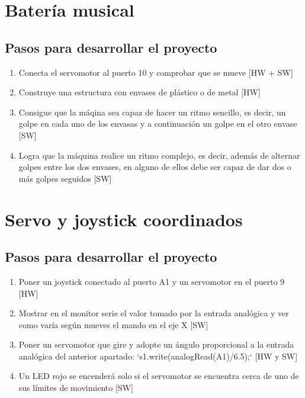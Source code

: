 \documentclass[11pt,spanish,a4paper]{article}
\begin{document}
\newpage
\section{Batería musical}

\subsection{Pasos para desarrollar el proyecto}
\begin{enumerate}
	\item Conecta el servomotor al puerto 10 y comprobar que se mueve [HW + SW]
	\item Construye una estructura con envases de plástico o de metal [HW]
	\item Consigue que la máqina sea capaz de hacer un ritmo sencillo, es decir, un golpe en
		cada uno de los envasas y a continuación un golpe en el otro envase [SW]
	\item Logra que la máquina realice un ritmo complejo, es decir, además de alternar golpes entre los
		dos envases, en alguno de ellos debe ser capaz de dar dos o más golpes seguidos [SW]
\end{enumerate}

\newpage
\section{Servo y joystick coordinados}

\subsection{Pasos para desarrollar el proyecto}
\begin{enumerate}
	\item Poner un joystick conectado al puerto A1 y un servomotor en el puerto 9 [HW]
	\item Mostrar en el monitor serie el valor tomado por la entrada analógica y ver como varía
		según mueves el mando en el eje X [SW]
	\item Poner un servomotor que gire y adopte un ángulo proporcional a la entrada analógica del 
		anterior apartado: `s1.write(analogRead(A1)/6.5);` [HW y SW]
	\item Un LED rojo se encenderá solo si el servomotor se encuentra cerca de uno de sus límites de
		movimiento [SW]
\end{enumerate}
\end{document}
